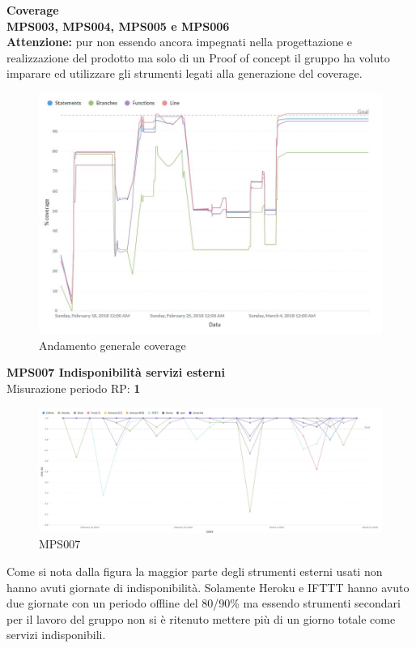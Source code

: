 \documentclass[PianoDiQualifica.tex]{subfiles}
\begin{document}
\newpage
\textbf{Coverage}
\\
	\textbf{MPS003, MPS004, MPS005 e MPS006}
\\
\textbf{Attenzione:} pur non essendo ancora impegnati nella progettazione e realizzazione del prodotto ma solo di un Proof of concept il gruppo ha voluto imparare ed utilizzare gli strumenti legati alla generazione del coverage.
\begin{figure}[H]
	\centering
	\includegraphics[width=1\linewidth]{RP/coverage}
	\caption{Andamento generale coverage}
	\label{fig:processi}
\end{figure}
\newpage


\textbf{MPS007 Indisponibilità servizi esterni}\\
Misurazione periodo RP: \textbf{1}
\begin{figure}[H]
	\centering
	\includegraphics[width=1\linewidth]{RP/MPS007}
	\caption{MPS007}
	\label{fig:processi}
\end{figure}
Come si nota dalla figura la maggior parte degli strumenti esterni usati non hanno avuti giornate di indisponibilità.
Solamente Heroku e IFTTT hanno avuto due giornate con un periodo offline del 80/90\% ma essendo strumenti secondari per il lavoro del gruppo non si è ritenuto mettere più di un giorno totale come servizi indisponibili.\\
\end{document}
